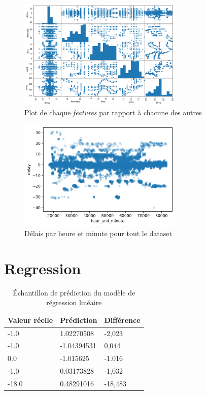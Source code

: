 \begin{appendices}
    \begin{figure}[ht]
        \centering
        \includegraphics[width=0.7\textwidth]{images/scatter_matrix.png}
        \caption{Plot de chaque \textit{features} par rapport à chacune des autres}
        \label{appendix:scatter_matrix}
    \end{figure}

    \begin{figure}[ht]
        \centering
        \includegraphics[width=0.7\textwidth]{images/delay_per_hour_and_minute.png}
        \caption{Délais par heure et minute pour tout le dataset}
        \label{appendix:delay_per_hour_and_minute}
    \end{figure}

    \chapter{Regression}
    \begin{table}[ht]
    \begin{tabular}{l|l|l}
        \textbf{Valeur réelle}&\textbf{Prédiction}&\textbf{Différence} \\
        \hline
        -1.0&1.02270508&-2,023 \\
        \hline
        -1.0&-1.04394531&0,044 \\
        \hline
        0.0&-1.015625&-1.016 \\
        \hline
        -1.0&0.03173828&-1,032 \\
        \hline
        -18.0&0.48291016&-18,483 \\
    \end{tabular}
    \caption{Échantillon de prédiction du modèle de régression linéaire}
    \label{appendix:linearReg}
    \end{table}


\end{appendices}
